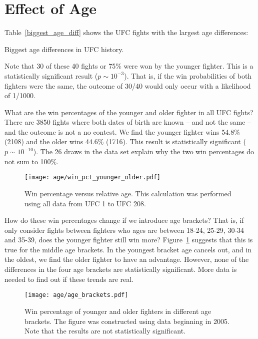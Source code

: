 \clearpage
\section{Effect of Age}
Table~\ref{biggest_age_diff} shows the UFC fights
with the largest age differences:

\begin{center}
\begin{table}[h!]

\caption{Biggest age differences in UFC history.}
\label{biggest_age_diff}
\end{table}
\end{center}

\clearpage

Note that 30 of these 40 fights or 75\% were won by the younger
fighter. This is a statistically
significant result ($p\sim 10^{-3}$). That is, if the win
probabilities of both fighters were the same, the outcome
of 30/40 would only occur with a likelihood of 1/1000.

What are the win percentages
of the younger and older fighter in all UFC fights?
There
are 3850 fights where both dates of birth are known
-- and not the same -- 
and the outcome is not a no contest.
We find
the younger fighter wins 54.8\% (2108) and the older
wins 44.6\% (1716). This result
is statistically significant ($p\sim 10^{-10}$).
The 26 draws in the data set explain why the two
win percentages do not sum to 100\%.

\begin{figure}[h]
\begin{center}
\texttt{[image: age/win\_pct\_younger\_older.pdf]}
\caption{Win percentage versus relative age. This calculation
was performed using all data from UFC 1 to UFC 208.}
\label{win_pct_younger_older}
\end{center}
\end{figure}

How do these win percentages change if we introduce
age brackets? That is, if only consider fights
between fighters who ages are between 18-24, 25-29,
30-34 and 35-39, does the younger fighter still win more?
Figure~\ref{win_pct_younger_older} suggests
that this is true for the middle age brackets. In the youngest
bracket age cancels out, and in the oldest, we find the
older fighter to have an advantage. However, none
of the differences in the four age brackets are statistically
significant. More data is needed to find out if these trends
are real.

\begin{figure}[h]
\begin{center}
\texttt{[image: age/age\_brackets.pdf]}
\caption{Win percentage of younger and older fighters
in different age brackets. The figure was constructed
using data beginning in 2005. Note that the results
are not statistically significant.}
\label{age_brackets}
\end{center}
\end{figure}

